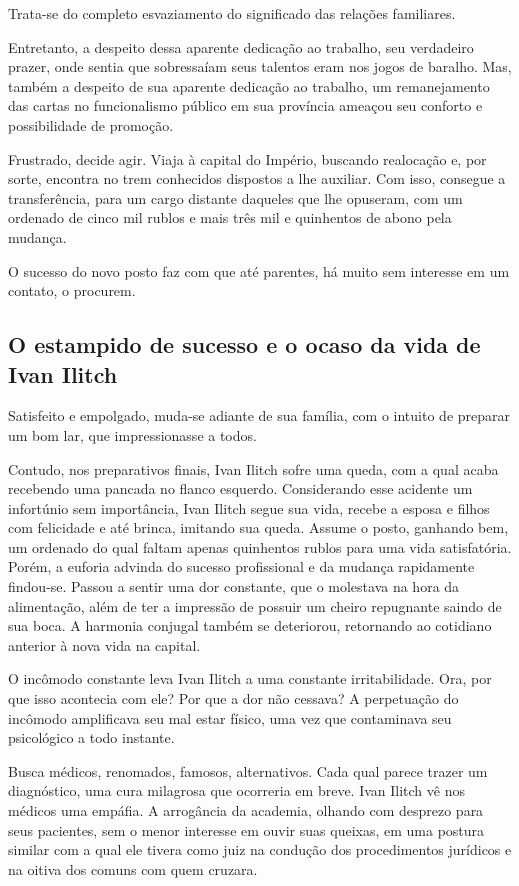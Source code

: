 \documentclass[12pt]{extarticle}
\begin{document}
Trata-se do completo esvaziamento do significado das relações
familiares.

Entretanto, a despeito dessa aparente dedicação ao trabalho, seu
verdadeiro prazer, onde sentia que sobressaíam seus talentos eram nos
jogos de baralho. Mas, também a despeito de sua aparente dedicação ao
trabalho, um remanejamento das cartas no funcionalismo público em sua
província ameaçou seu conforto e possibilidade de promoção.

Frustrado, decide agir. Viaja à capital do Império, buscando realocação
e, por sorte, encontra no trem conhecidos dispostos a lhe auxiliar. Com
isso, consegue a transferência, para um cargo distante daqueles que lhe
opuseram, com um ordenado de cinco mil rublos e mais três mil e
quinhentos de abono pela mudança.

O sucesso do novo posto faz com que até parentes, há muito sem interesse
em um contato, o procurem.

\subsection{O estampido de sucesso e o ocaso da vida de Ivan Ilitch}

Satisfeito e empolgado, muda-se adiante de sua família, com o intuito de
preparar um bom lar, que impressionasse a todos.

Contudo, nos preparativos finais, Ivan Ilitch sofre uma queda, com a
qual acaba recebendo uma pancada no flanco esquerdo. Considerando esse
acidente um infortúnio sem importância, Ivan Ilitch segue sua vida,
recebe a esposa e filhos com felicidade e até brinca, imitando sua
queda. Assume o posto, ganhando bem, um ordenado do qual faltam apenas
quinhentos rublos para uma vida satisfatória. Porém, a euforia advinda
do sucesso profissional e da mudança rapidamente findou-se. Passou a
sentir uma dor constante, que o molestava na hora da alimentação, além
de ter a impressão de possuir um cheiro repugnante saindo de sua boca. A
harmonia conjugal também se deteriorou, retornando ao cotidiano anterior
à nova vida na capital.

O incômodo constante leva Ivan Ilitch a uma constante irritabilidade.
Ora, por que isso acontecia com ele? Por que a dor não cessava? A
perpetuação do incômodo amplificava seu mal estar físico, uma vez que
contaminava seu psicológico a todo instante.

Busca médicos, renomados, famosos, alternativos. Cada qual parece trazer
um diagnóstico, uma cura milagrosa que ocorreria em breve. Ivan Ilitch
vê nos médicos uma empáfia. A arrogância da academia, olhando com
desprezo para seus pacientes, sem o menor interesse em ouvir suas
queixas, em uma postura similar com a qual ele tivera como juiz na
condução dos procedimentos jurídicos e na oitiva dos comuns com quem
cruzara.
\end{document}
